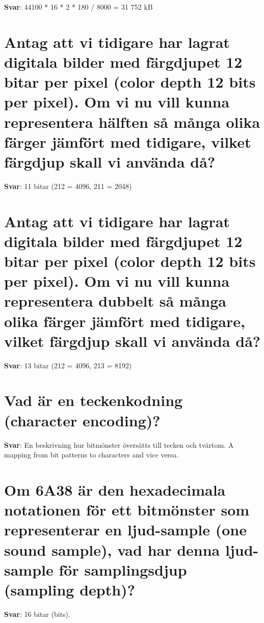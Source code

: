 \documentclass[a4paper,11pt,oneside]{book}
\begin{document}
\begin{sloppypar}
\label{q:65:sa:sv:True}

\textbf{Svar}: 44100 * 16 * 2 * 180 / 8000 = 31 752 kB



\section{Antag att vi tidigare har lagrat digitala bilder med f\"argdjupet 12 bitar per pixel (color depth 12 bits per pixel). Om vi nu vill kunna representera h\"alften s\r{a} m\r{a}nga olika f\"arger j\"amf\"ort med tidigare, vilket f\"argdjup skall vi anv\"anda d\r{a}?}

\label{q:66:sa:sv:True}

\textbf{Svar}: 11 bitar (212 = 4096, 211 = 2048)



\section{Antag att vi tidigare har lagrat digitala bilder med f\"argdjupet 12 bitar per pixel (color depth 12 bits per pixel). Om vi nu vill kunna representera dubbelt s\r{a} m\r{a}nga olika f\"arger j\"amf\"ort med tidigare, vilket f\"argdjup skall vi anv\"anda d\r{a}?}

\label{q:67:sa:sv:True}

\textbf{Svar}: 13 bitar (212 = 4096, 213 = 8192)



\section{Vad \"ar en teckenkodning (character encoding)?}

\label{q:68:sa:sv:True}

\textbf{Svar}: En beskrivning hur bitm\"onster \"overs\"atts till tecken och tv\"artom. A mapping from bit patterns to characters and vice versa.



\section{Om 6A38 \"ar den hexadecimala notationen f\"or ett bitm\"onster som representerar en ljud-sample (one sound sample), vad har denna ljud-sample f\"or samplingsdjup (sampling depth)?}

\label{q:71:sa:sv:True}

\textbf{Svar}: 16 bitar (bits).




\end{sloppypar}
\end{document}
